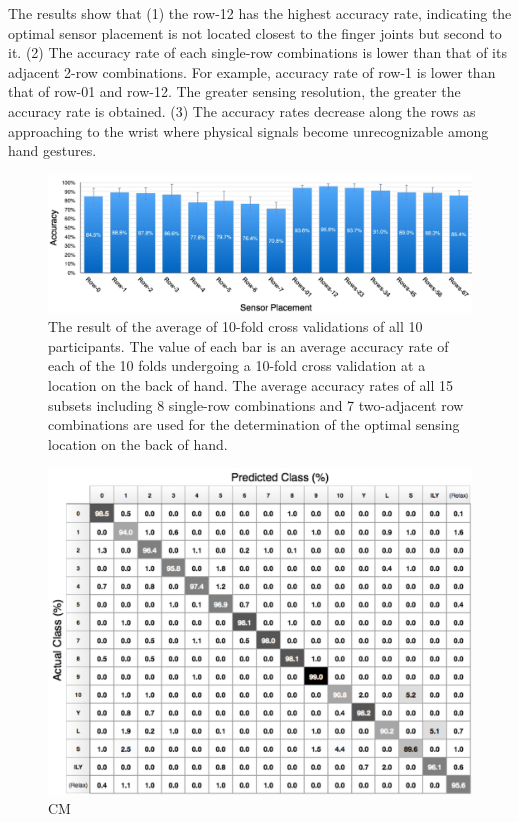 \documentclass{sigchi}
\begin{document}
The results show that
(1) the row-12 has the highest accuracy rate, indicating the optimal sensor placement is not located closest to the finger joints but second to it. 
(2) The accuracy rate of each single-row combinations is lower than that of its adjacent 2-row combinations. For example, accuracy rate of row-1 is lower than that of row-01 and row-12. The greater sensing resolution, the greater the accuracy rate is obtained. 
(3) The accuracy rates decrease along the rows as approaching to the wrist where physical signals become unrecognizable among hand gestures.

\begin{figure}
 \begin{center}
  \includegraphics[width=2\columnwidth]{figures/10FCV_16.pdf}
  \caption{
    The result of the average of 10-fold cross validations of all 10 participants. The value of each bar is an average accuracy rate of each of the 10 folds undergoing a 10-fold cross validation at a location on the back of hand. The average accuracy rates of all 15 subsets including 8 single-row combinations and 7 two-adjacent row combinations are used for the determination of the optimal sensing location on the back of hand.
  }
  \label{fig:accuracy16Gs}
  \end{center}
\end{figure}

\begin{figure}
  \begin{center}
  \includegraphics[width=1\columnwidth]{figures/CM_v1.pdf}
  \caption{CM}
  \label{fig:CM}
  \end{center}
\end{figure}
\end{document}
